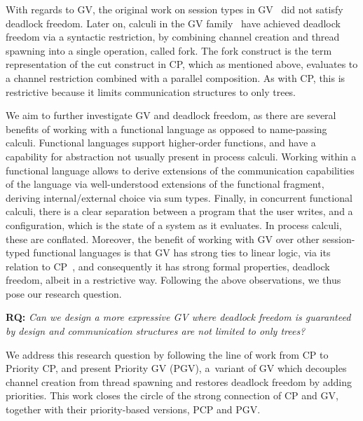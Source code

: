 \documentclass[main.tex]{subfiles}
\begin{document}
With regards to GV, the original work on session types in GV~\cite{gayvasconcelos10,gayvasconcelos12} did not satisfy deadlock freedom. Later on, calculi in the GV family~\cite{wadler14,lindleymorris15} have achieved deadlock freedom via a syntactic restriction, \ie by combining channel creation and thread spawning into a single operation, called fork. The fork construct is the term representation of the cut construct in CP, which as mentioned above, evaluates to a channel restriction combined with a parallel composition. As with CP, this is restrictive because it limits communication structures to only trees.

We aim to further investigate GV and deadlock freedom, as there are several benefits of working with a functional language as opposed to name-passing calculi. Functional languages support higher-order functions, and have a capability for abstraction not usually present in process calculi. Working within a functional language allows to derive extensions of the communication capabilities of the language via well-understood extensions of the functional fragment, \ie deriving internal/external choice via sum types. Finally, in concurrent functional calculi, there is a clear separation between a program that the user writes, and a configuration, which is the state of a system as it evaluates. In process calculi, these are conflated.
Moreover, the benefit of working with GV over other session-typed functional languages is that GV has strong ties to linear logic, via its relation to CP~\cite{wadler14}, and consequently it has strong formal properties, \eg deadlock freedom, albeit in a restrictive way.
Following the above observations, we thus pose our research question.

\textbf{RQ:} \emph{Can we design a more expressive GV where deadlock freedom is guaranteed by design and communication structures are not limited to only trees?}

We address this research question by following the line of work from CP to Priority CP, and present
Priority GV (PGV), a~variant of GV which decouples channel creation from thread spawning and restores deadlock freedom by adding priorities. This work closes the circle of the strong connection of CP and GV, together with their priority-based versions, PCP and PGV.
\end{document}
